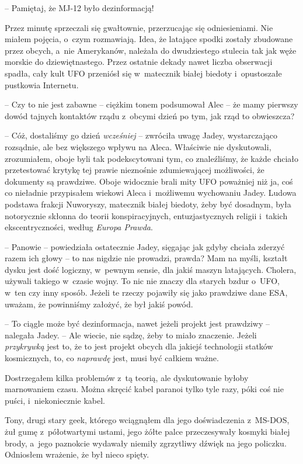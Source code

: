 \documentclass[oneside,polish,12pt,sfheadings]{mwbk}
\begin{document}
-- Pamiętaj, że MJ-12 było dezinformacją!

Przez minutę sprzeczali się gwałtownie, przerzucając się odniesieniami.
Nie miałem pojęcia, o~czym rozmawiają. Idea, że latające spodki zostały
zbudowane przez obcych, a~nie Amerykanów, należała do dwudziestego
stulecia tak jak węże morskie do dziewiętnastego. Przez ostatnie dekady
nawet liczba obserwacji spadła, cały kult UFO przeniósł się w~matecznik
białej biedoty i~opustoszałe pustkowia Internetu.

-- Czy to nie jest zabawne -- ciężkim tonem podsumował Alec -- że mamy
pierwszy dowód tajnych kontaktów rządu z~obcymi dzień po tym, jak rząd
to obwieszcza?

-- Cóż, dostaliśmy go dzień \emph{wcześniej} -- zwróciła uwagę Jadey,
wystarczająco rozsądnie, ale bez większego wpływu na Aleca. Właściwie
nie dyskutowali, zrozumiałem, oboje byli tak podekscytowani tym, co
znaleźliśmy, że każde chciało przetestować krytykę tej prawie nieznośnie
zdumiewającej możliwości, że dokumenty są prawdziwe. Oboje widocznie brali
mity UFO poważniej niż ja, coś co nieładnie przypisałem wiekowi Aleca i~możliwemu wychowaniu Jadey. Ludowa podstawa frakcji Nuworyszy, matecznik
białej biedoty, żeby być dosadnym, była notorycznie skłonna do teorii
konspiracyjnych, entuzjastycznych religii i~takich ekscentryczności,
według \emph{Europa Prawda}.

-- Panowie -- powiedziała ostatecznie Jadey, sięgając jak gdyby chciała
zderzyć razem ich głowy -- to nas nigdzie nie prowadzi, prawda? Mam na
myśli, kształt dysku jest dość logiczny, w~pewnym sensie, dla jakiś
maszyn latających. Cholera, używali takiego w~czasie wojny. To nic nie
znaczy dla starych bzdur o~UFO, w~ten czy inny sposób. Jeżeli te rzeczy
pojawiły się jako prawdziwe dane ESA, uważam, że powinniśmy założyć, że
był jakiś powód.

-- To ciągle może być dezinformacja, nawet jeżeli projekt jest prawdziwy
-- nalegała Jadey. -- Ale wiecie, nie sądzę, żeby to miało znaczenie.
Jeżeli \emph{przykrywką} jest to, że to jest projekt obcych dla jakiejś
technologii statków kosmicznych, to, co \emph{naprawdę} jest, musi być
całkiem ważne.

Dostrzegałem kilka problemów z~tą teorią, ale dyskutowanie byłoby
marnowaniem czasu. Można skręcić kabel paranoi tylko tyle razy, póki coś
nie puści, i~niekoniecznie kabel.

Tony, drugi stary geek, którego wciągnąłem dla jego doświadczenia z~MS-DOS, żuł gumę z~półotwartymi ustami, jego żółte palce przeczesywały
kosmyki białej brody, a~jego paznokcie wydawały niemiły zgrzytliwy
dźwięk na jego policzku. Odniosłem wrażenie, że był nieco spięty.
\end{document}
